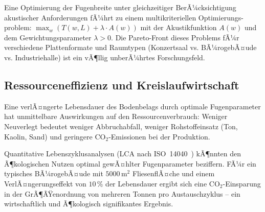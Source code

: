 ﻿\documentclass[a4paper,12pt]{article}
\theoremstyle{definition}
\begin{document}
Eine Optimierung der Fugenbreite unter gleichzeitiger BerÃ¼cksichtigung
akustischer Anforderungen fÃ¼hrt zu einem multikriteriellen Optimierungs-
problem: $\max_w (T(w, L) + \lambda \cdot A(w))$ mit der Akustikfunktion
$A(w)$ und dem Gewichtungsparameter $\lambda > 0$.
Die Pareto-Front dieses Problems fÃ¼r verschiedene Plattenformate
und Raumtypen (Konzertsaal vs. BÃ¼rogebÃ¤ude vs. Industriehalle)
ist ein vÃ¶llig unberÃ¼hrtes Forschungsfeld.

\subsection{Ressourceneffizienz und Kreislaufwirtschaft}

Eine verlÃ¤ngerte Lebensdauer des Bodenbelags durch optimale Fugenparameter
hat unmittelbare Auswirkungen auf den Ressourcenverbrauch: Weniger
Neuverlegt bedeutet weniger Abbruchabfall, weniger Rohstoffeinsatz
(Ton, Kaolin, Sand) und geringere CO$_2$-Emissionen bei der Produktion.

Quantitative Lebenszyklusanalysen (LCA nach ISO~14040~\cite{iso14040})
kÃ¶nnten den Ã¶kologischen Nutzen optimal gewÃ¤hlter Fugenparameter
beziffern. FÃ¼r ein typisches BÃ¼rogebÃ¤ude mit $5000\,\text{m}^2$
FliesenflÃ¤che und einem VerlÃ¤ngerungseffekt von $10\,\%$ der
Lebensdauer ergibt sich eine CO$_2$-Einsparung in der GrÃ¶ÃŸenordnung
von mehreren Tonnen pro Austauschzyklus -- ein wirtschaftlich und
Ã¶kologisch signifikantes Ergebnis.
\end{document}
